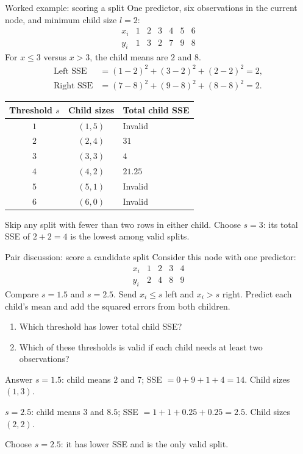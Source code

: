 \documentclass[10pt]{beamer}
\begin{document}
\begin{frame}{Worked example: scoring a split}
\small
One predictor, six observations in the current node, and minimum child size $l=2$:
\[
\begin{array}{c|rrrrrr}
x_i & 1 & 2 & 3 & 4 & 5 & 6\\
y_i & 1 & 3 & 2 & 7 & 9 & 8
\end{array}
\]
For $x\leq 3$ versus $x>3$, the child means are $2$ and $8$.
\[
\begin{aligned}
\text{Left SSE}  &= (1-2)^2+(3-2)^2+(2-2)^2=2,\\
\text{Right SSE} &= (7-8)^2+(9-8)^2+(8-8)^2=2.
\end{aligned}
\]
\pause
\begin{center}
\begin{tabular}{c|c|l}
Threshold $s$ & Child sizes & Total child SSE\\ \hline
$1$ & $(1,5)$ & Invalid\\
$2$ & $(2,4)$ & $31$\\
$3$ & $(3,3)$ & $4$\\
$4$ & $(4,2)$ & $21.25$
\\
$5$ & $(5,1)$ & Invalid\\
$6$ & $(6,0)$ & Invalid
\end{tabular}
\end{center}
Skip any split with fewer than two rows in either child. Choose $s=3$: its total SSE of $2+2=4$ is the lowest among valid splits.
\end{frame}

\begin{frame}{Pair discussion: score a candidate split}
\small
Consider this node with one predictor:
\[
\begin{array}{c|rrrr}
x_i & 1 & 2 & 3 & 4\\
y_i & 2 & 4 & 8 & 9
\end{array}
\]
Compare $s=1.5$ and $s=2.5$. Send $x_i\leq s$ left and $x_i>s$ right.
Predict each child's mean and add the squared errors from both children.

\begin{enumerate}
\item Which threshold has lower total child SSE?
\item Which of these thresholds is valid if each child needs at least two observations?
\end{enumerate}
\pause
\begin{block}{Answer}
\small
$s=1.5$: child means $2$ and $7$; SSE $=0+9+1+4=14$. Child sizes $(1,3)$.

$s=2.5$: child means $3$ and $8.5$; SSE $=1+1+0.25+0.25=2.5$. Child sizes $(2,2)$.

Choose $s=2.5$: it has lower SSE and is the only valid split.
\end{block}
\end{frame}
\end{document}
